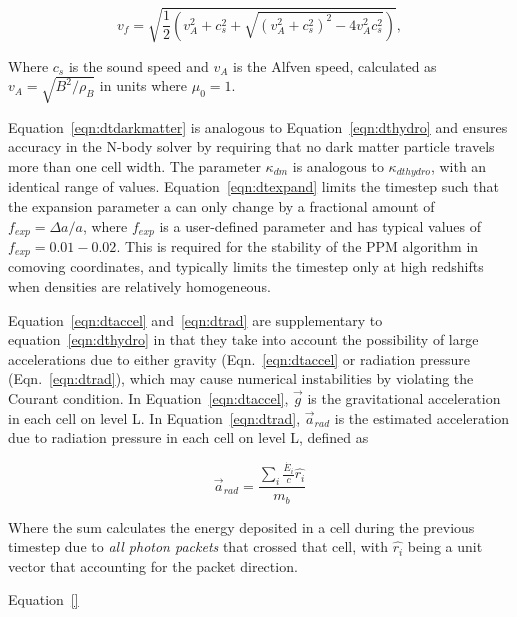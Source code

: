 \begin{equation}
v_f = \sqrt{ \frac{1}{2} \left(  v_A^2 + c_s^2 + \sqrt{(v_A^2 +
      c_s^2)^2 - 4 v_A^2 c_s^2}  \right)  },
\label{eqn:vfastmhd}
\end{equation}

Where $c_s$ is the sound speed and $v_A$ is the Alfven speed, calculated
as $v_A = \sqrt{B^2/\rho_B}$ in units where $\mu_0 = 1$.

Equation~\ref{eqn:dtdarkmatter} is analogous to
Equation~\ref{eqn:dthydro} and ensures accuracy in the N-body solver
by requiring that no dark matter particle travels more than one cell
width.  The parameter $\kappa_{dm}$ is analogous to
$\kappa_{dthydro}$, with an identical range of values.
Equation~\ref{eqn:dtexpand} limits the timestep such that the
expansion parameter a can only change by a fractional amount of
$f_{exp} = \Delta a/a$, where $f_{exp}$ is a user-defined parameter
and has typical values of $f_{exp} = 0.01-0.02$.  This is required for
the stability of the PPM algorithm in comoving coordinates, and
typically limits the timestep only at high redshifts when densities
are relatively homogeneous.

Equation~\ref{eqn:dtaccel} and~\ref{eqn:dtrad} are supplementary to equation~\ref{eqn:dthydro} in that they
take into account the possibility of large accelerations due to either
gravity (Eqn.~\ref{eqn:dtaccel} or radiation pressure
(Eqn.~\ref{eqn:dtrad}), which may cause numerical 
instabilities by violating the Courant condition.  In Equation~\ref{eqn:dtaccel}, $\vec{g}$ is the
gravitational acceleration in each cell on level L.  In
Equation~\ref{eqn:dtrad}, $\vec{a}_{rad}$ is the estimated
acceleration due to radiation pressure in each cell on level L,
defined as

\begin{equation}
\vec{a}_{rad} = \frac{ \sum_i \frac{\dot{E_i}}{c} \hat{r_i} }{m_b} 
\end{equation}

Where the sum calculates the energy deposited in a cell during the
previous timestep due to \textit{all photon packets} that crossed that
cell, with $\hat{r_i}$ being a unit vector that accounting for the
packet direction.

Equation~\ref{}